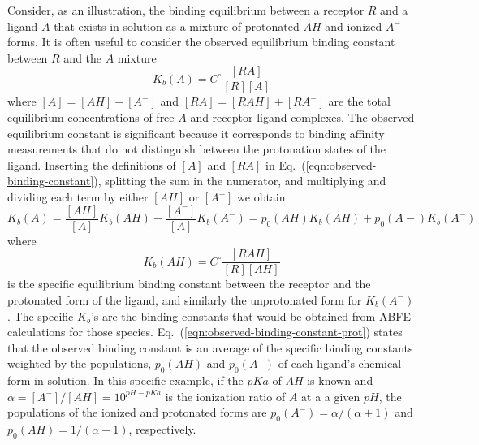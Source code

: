 \documentclass[9pt,bestpractices]{livecoms}
\begin{document}
Consider, as an illustration, the binding equilibrium between a receptor $R$ and a ligand $A$ that exists in solution as a mixture of protonated $AH$ and ionized $A^-$ forms. It is often useful to consider the observed equilibrium binding constant between $R$ and the $A$ mixture 
\begin{equation}
  K_b(A) = C^\circ \frac{[RA]}{[R][A]}
  \label{eqn:observed-binding-constant}
\end{equation}
where $[A] = [AH] + [A^-]$ and $[RA] = [RAH] + [RA^-]$ are the total equilibrium concentrations of free $A$ and receptor-ligand complexes. The observed equilibrium constant is significant because it corresponds to binding affinity measurements that do not distinguish between the protonation states of the ligand. Inserting the definitions of $[A]$ and $[RA]$ in Eq.~(\ref{eqn:observed-binding-constant}), splitting the sum in the numerator, and multiplying and dividing each term by either $[AH]$ or $[A^-]$ we obtain
\begin{equation}
  K_b(A) = \frac{[AH]}{[A]}  K_b(AH) +  \frac{[A^-]}{[A]} K_b(A^-) =  p_0(AH) K_b(AH) +  p_0(A-) K_b(A^-)
  \label{eqn:observed-binding-constant-split}
\end{equation}
where
\begin{equation}
  K_b(AH) = C^\circ \frac{[RAH]}{[R][AH]}
  \label{eqn:observed-binding-constant-prot}
\end{equation}
is the specific equilibrium binding constant between the receptor and the protonated form of the ligand, and similarly the unprotonated form for $K_b(A^-)$. The specific $K_b$'s are the binding constants that would be obtained from ABFE calculations for those species. Eq.~(\ref{eqn:observed-binding-constant-prot}) states that the observed binding constant is an average of the specific binding constants weighted by the populations, $p_0(AH)$ and  $p_0(A^-)$ of each ligand's chemical form in solution. In this specific example, if the $pKa$ of $AH$ is known and $\alpha = [A^-]/[AH] = 10^{pH-pKa} $ is the ionization ratio of $A$ at a a given $pH$, the populations of the ionized and protonated forms are $p_0(A^-) = \alpha/(\alpha+1)$ and $p_0(AH) = 1/(\alpha+1)$, respectively.\cite{champion2024multistate,azimi2022application}
\end{document}
